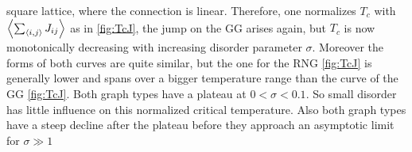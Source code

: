     square lattice, where the connection is linear. Therefore, one
    normalizes \(T_c\) with \(\left< \sum_{\left< i,j \right>} J_{ij} \right>\) as in
    \ref{fig:TcJ}, the
    jump on the GG arises again, but \(T_c\) is now monotonically
    decreasing with increasing disorder parameter \(\sigma\).
    Moreover the forms of both curves are quite similar, but the
    one for the RNG \ref{fig:TcJ}
    is generally lower and spans over a bigger temperature range than
    the curve of the GG \ref{fig:TcJ}.
    Both graph types have a plateau at \(0 < \sigma < 0.1\). So small
    disorder has little influence on this normalized critical temperature.
    Also both graph types have a steep decline after the plateau before
    they approach an asymptotic limit for \(\sigma \gg 1\)\\\\

